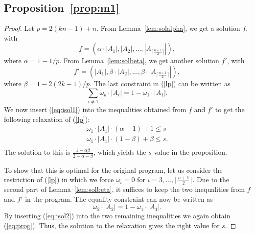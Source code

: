 \documentclass[11pt,a4paper]{article}
\begin{document}
\subsection*{Proposition~\ref{prop:m1}}
\begin{proof}
  Let $p = 2(kn-1)+n$.
  From Lemma~\ref{lem:solalpha}, we get a solution $f$, with
  \begin{equation}
  f = (\alpha \cdot |A_1|, |A_2|, \ldots, |A_{\lceil \frac{n+1}{2} \rceil}|),
  \end{equation}
  where $\alpha = 1-1/p$.
  From Lemma~\ref{lem:solbeta}, we get another solution $f'$, with
  \begin{equation}
  f' = (|A_1|, \beta \cdot |A_2|, \ldots, \beta \cdot |A_{\lceil \frac{n+1}{2} \rceil}|),
  \end{equation}
  where $\beta = 1 - 2(2k-1)/p$.
  The last constraint in (\ref{lp}) can be written as
  \begin{equation}
    \label{eq:isol1}
    \sum_{i \neq 1} \omega_k \cdot |A_i| = 1 - \omega_1 \cdot |A_1|.
  \end{equation}
  We now insert (\ref{eq:isol1}) into the inequalities obtained from $f$ and
  $f'$ to get the following relaxation of (\ref{lp}):
  \begin{equation}
    \label{eq:prog}
    \begin{array}{l}
      \omega_1 \cdot |A_1| \cdot (\alpha-1) + 1 \leq s \\
      \omega_1 \cdot |A_1| \cdot (1-\beta) + \beta \leq s. \\
    \end{array}
  \end{equation}
  The solution to this is $\frac{1-\alpha\beta}{2-\alpha-\beta}$,
  which yields the $s$-value in the proposition.

  To show that this is optimal for the original program,
  let us consider the restriction of (\ref{lp}) in which we force
  $\omega_i = 0$ for $i = 3, \ldots, \lceil \frac{n+1}{2} \rceil$.
  Due to the second part of Lemma~\ref{lem:solbeta}, it suffices to
  keep the two inequalities from $f$ and $f'$ in the program.
  The equality constraint can now be written as
  \begin{equation}
    \label{eq:isol2}
    \omega_2 \cdot |A_2| = 1 - \omega_1 \cdot |A_1|.
  \end{equation}
  By inserting (\ref{eq:isol2}) into the two remaining
  inequalities we again obtain (\ref{eq:prog}).
  Thus, the solution to the relaxation gives the right value for $s$.
\end{proof}
\end{document}
